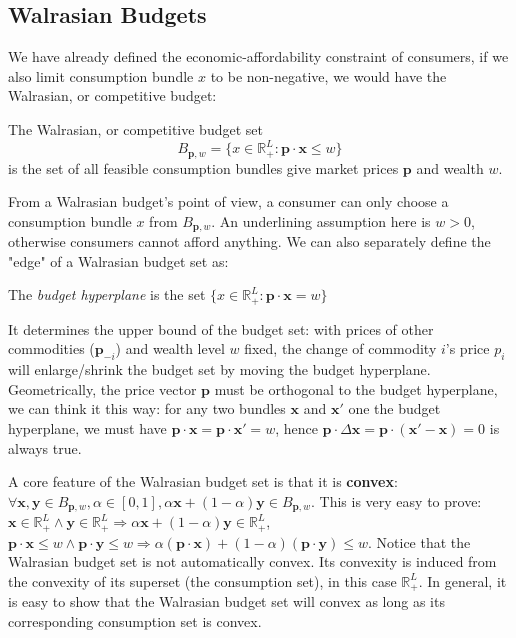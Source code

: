 \subsection{Walrasian Budgets}
We have already defined the economic-affordability constraint of consumers, if we also limit consumption bundle $x$ to be non-negative, we would have the Walrasian, or competitive budget:

\begin{definition}
    The Walrasian, or competitive budget set $$B_{\mathbf{p},w}=\{x\in\mathbb{R}^L_+:\mathbf{p}\cdot\mathbf{x}\leq w\}$$ is the set of all feasible consumption bundles give market prices $\mathbf{p}$ and wealth $w$.
\end{definition}

From a Walrasian budget's point of view, a consumer can only choose a consumption bundle $x$ from $B_{\mathbf{p},w}$. An underlining assumption here is $w>0$, otherwise consumers cannot afford anything. We can also
separately define the "edge" of a Walrasian budget set as:
\begin{definition}
    The \textit{budget hyperplane} is the set $\{x\in\mathbb{R}^L_+:\mathbf{p}\cdot\mathbf{x}=w\}$
\end{definition}
It determines the upper bound of the budget set: with prices of other commodities ($\mathbf{p}_{-i}$) and wealth level $w$ fixed, the change of commodity $i$'s price $p_i$ will enlarge/shrink the budget set by moving the budget hyperplane.
Geometrically, the price vector $\mathbf{p}$ must be orthogonal to the budget hyperplane, we can think it this way: for any two bundles $\mathbf{x}$ and $\mathbf{x}'$ one the budget hyperplane, we must have $\mathbf{p}\cdot\mathbf{x}=\mathbf{p}\cdot\mathbf{x}'=w$, hence
$\mathbf{p}\cdot\Delta\mathbf{x}=\mathbf{p}\cdot(\mathbf{x}'-\mathbf{x})=0$ is always true.

A core feature of the Walrasian budget set is that it is \textbf{convex}: $\forall \mathbf{x},\mathbf{y}\in B_{\mathbf{p},w}, \alpha\in[0,1], \alpha\mathbf{x}+(1-\alpha)\mathbf{y}\in B_{\mathbf{p},w}$. This is very easy to prove: $\mathbf{x}\in\mathbb{R}^L_+\land\mathbf{y}\in\mathbb{R}^L_+\Rightarrow \alpha\mathbf{x}+(1-\alpha)\mathbf{y}\in \mathbb{R}^L_+$, $\mathbf{p}\cdot\mathbf{x}\leq w\land\mathbf{p}\cdot \mathbf{y}\leq w\Rightarrow \alpha(\mathbf{p}\cdot\mathbf{x})+(1-\alpha)(\mathbf{p}\cdot\mathbf{y})\leq w$.
Notice that the Walrasian budget set is not automatically convex. Its convexity is induced from the convexity of its superset (the consumption set), in this case $\mathbb{R}^L_+$. In general, it is easy to show that the Walrasian budget set will convex as long as its corresponding consumption set is convex.

